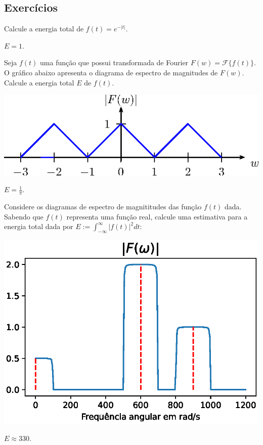 \subsection*{Exercícios}
\begin{exer} Calcule a energia total de $f(t)=e^{-|t|}$. 
\end{exer}
\begin{resp}$E=1.$
\end{resp}

\begin{exer} Seja $f(t)$ uma função que possui transformada de Fourier $F(w)=\mathcal{F}\{f(t)\}$. O gráfico abaixo apresenta o diagrama de espectro de magnitudes de $F(w)$. Calcule a energia total $E$ de $f(t)$.
\begin{center}
     \includegraphics{cap_propriedades_transformada/pics/diagrama_7A}
\end{center}
\end{exer}
\begin{resp}
    $E=\frac{1}{\pi}.$
\end{resp}

\begin{exer} Considere os diagramas de espectro de magnititudes das função $f(t)$ dada.
Sabendo que $f(t)$ representa uma função real, calcule uma estimativa para a energia total dada por $E:=\int_{-\infty}^\infty |f(t)|^2dt$:

\begin{center}
    \includegraphics{cap_propriedades_transformada/pics/diagrama_FG_2}
\end{center}
\end{exer}
\begin{resp}
    $E\approx 330.$
\end{resp}


